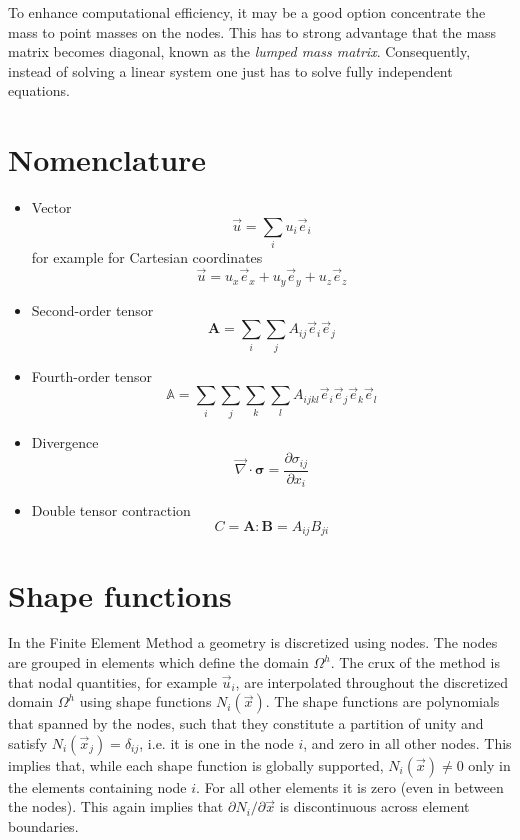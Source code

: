 \documentclass[times,namecite]{goose-article}
\begin{document}
To enhance computational efficiency, it may be a good option concentrate the mass to point masses on the nodes. This has to strong advantage that the mass matrix becomes diagonal, known as the \emph{lumped mass matrix}. Consequently, instead of solving a linear system one just has to solve fully independent equations.

\appendix

\section{Nomenclature}

\begin{itemize}
  \item Vector
  \begin{equation}
    \vec{u} = \sum\limits_i u_i \vec{e}_i
  \end{equation}
  for example for Cartesian coordinates
  \begin{equation}
    \vec{u} = u_x \vec{e}_x + u_y \vec{e}_y + u_z \vec{e}_z
  \end{equation}
  \item Second-order tensor
  \begin{equation}
    \bm{A} = \sum\limits_i \sum\limits_j A_{ij} \vec{e}_i \vec{e}_j
  \end{equation}
  \item Fourth-order tensor
  \begin{equation}
    \mathbb{A} = \sum\limits_i \sum\limits_j \sum\limits_k \sum\limits_l A_{ijkl} \vec{e}_i \vec{e}_j \vec{e}_k \vec{e}_l
  \end{equation}
  \item Divergence
  \begin{equation}
    \vec{\nabla} \cdot \bm{\sigma} = \frac{ \partial \sigma_{ij} }{ \partial x_i }
  \end{equation}
  \item Double tensor contraction
  \begin{equation}
    C = \bm{A} : \bm{B} = A_{ij} B_{ji}
  \end{equation}
\end{itemize}

\section{Shape functions}

In the Finite Element Method a geometry is discretized using nodes. The nodes are grouped in elements which define the domain $\Omega^h$. The crux of the method is that nodal quantities, for example $\vec{u}_i$, are interpolated throughout the discretized domain $\Omega^h$ using shape functions $N_i (\vec{x})$. The shape functions are polynomials that spanned by the nodes, such that they constitute a partition of unity and satisfy $N_i (\vec{x}_j) = \delta_{ij}$, i.e. it is one in the node $i$, and zero in all other nodes. This implies that, while each shape function is globally supported, $N_i (\vec{x}) \neq 0$ only in the elements containing node $i$. For all other elements it is zero (even in between the nodes). This again implies that $\partial N_i / \partial \vec{x}$ is discontinuous across element boundaries.
\end{document}
